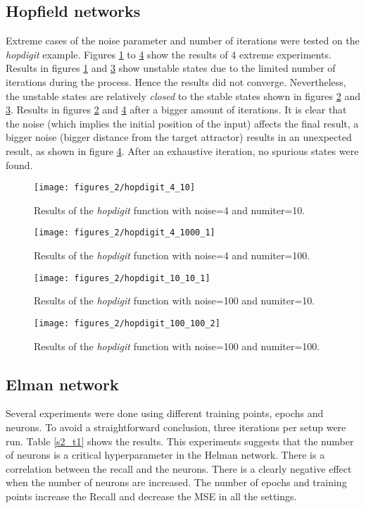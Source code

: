 \subsection{Hopfield networks}
Extreme cases of the noise parameter and number of iterations were tested on the \textit{hopdigit} example. Figures \ref{sec2_2} to \ref{sec2_3} show the results of 4 extreme experiments.
\bigbreak
Results in figures \ref{sec2_2} and \ref{sec2_4} show unstable states due to the limited number of iterations during the process. Hence the results did not converge. Nevertheless, the unstable states are relatively \textit{closed} to the stable states shown in figures \ref{sec2_1} and \ref{sec2_4}.
\bigbreak
Results in figures \ref{sec2_1} and \ref{sec2_3} after a bigger amount of iterations. It is clear that the noise (which implies the initial position of the input) affects the final result, a bigger noise (bigger distance from the target attractor) results in an unexpected result, as shown in figure \ref{sec2_3}.
\bigbreak
After an exhaustive iteration, no spurious states were found. 
\begin{figure}[!htbp]
\caption{Results of the \textit{hopdigit} function with noise=4 and numiter=10.}
\label{sec2_2}
\texttt{[image: figures\_2/hopdigit\_4\_10]}
\centering
\end{figure}

\begin{figure}[!htbp]
\caption{Results of the \textit{hopdigit} function with noise=4 and numiter=100.}
\label{sec2_1}
\medbreak
\texttt{[image: figures\_2/hopdigit\_4\_1000\_1]}
\centering
\end{figure}

\begin{figure}[!htbp]
\caption{Results of the \textit{hopdigit} function with noise=100 and numiter=10.}
\label{sec2_4}
\medbreak
\texttt{[image: figures\_2/hopdigit\_10\_10\_1]}
\centering
\end{figure}

\begin{figure}[!htbp]
\caption{Results of the \textit{hopdigit} function with noise=100 and numiter=100.}
\label{sec2_3}
\medbreak
\texttt{[image: figures\_2/hopdigit\_100\_100\_2]}
\centering
\end{figure}

\newpage

\subsection{Elman network}
Several experiments were done using different training points, epochs and neurons. To avoid a straightforward conclusion, three iterations per setup were run. Table \ref{s2_t1} shows the results.
\bigbreak
This experiments suggests that the number of neurons is a critical hyperparameter in the Helman network. There is a correlation between the recall and the neurons. There is a clearly negative effect when the number of neurons are increased. The number of epochs and training points increase the Recall and decrease the MSE in all the settings.


